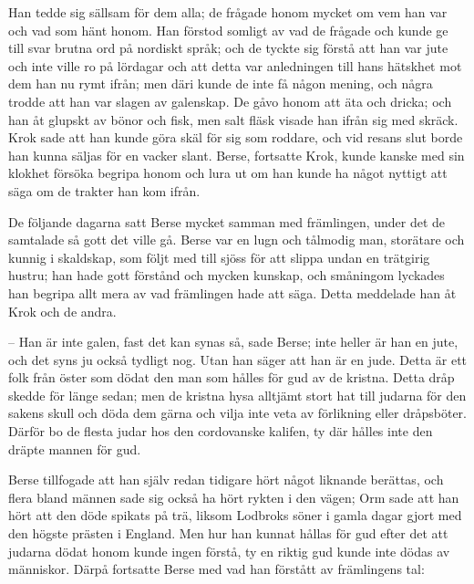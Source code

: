 \initial Han tedde sig sällsam för dem alla; de frågade honom mycket om vem han var och vad som hänt honom. Han förstod somligt av vad de frågade och kunde ge till svar brutna ord på nordiskt språk; och de tyckte sig förstå att han var jute och inte ville ro på lördagar och att detta var anledningen till hans hätskhet mot dem han nu rymt ifrån; men däri kunde de inte få någon mening, och några trodde att han var slagen av galenskap. De gåvo honom att äta och dricka; och han åt glupskt av bönor och fisk, men salt fläsk visade han ifrån sig med skräck. Krok sade att han kunde göra skäl för sig som roddare, och vid resans slut borde han kunna säljas för en vacker slant. Berse, fortsatte Krok, kunde kanske med sin klokhet försöka begripa honom och lura ut om han kunde ha något nyttigt att säga om de trakter han kom ifrån.

\initial De följande dagarna satt Berse mycket samman med främlingen, under det de samtalade så gott det ville gå. Berse var en lugn och tålmodig man, storätare och kunnig i skaldskap, som följt med till sjöss för att slippa undan en trätgirig hustru; han hade gott förstånd och mycken kunskap, och småningom lyckades han begripa allt mera av vad främlingen hade att säga. Detta meddelade han åt Krok och de andra.

– Han är inte galen, fast det kan synas så, sade Berse; inte heller är han en jute, och det syns ju också tydligt nog. Utan han säger att han är en jude. Detta är ett folk från öster som dödat den man som hålles för gud av de kristna. Detta dråp skedde för länge sedan; men de kristna hysa alltjämt stort hat till judarna för den sakens skull och döda dem gärna och vilja inte veta av förlikning eller dråpsböter. Därför bo de flesta judar hos den cordovanske kalifen, ty där hålles inte den dräpte mannen för gud.

\initial Berse tillfogade att han själv redan tidigare hört något liknande berättas, och flera bland männen sade sig också ha hört rykten i den vägen; Orm sade att han hört att den döde spikats på trä, liksom Lodbroks söner i gamla dagar gjort med den högste prästen i England. Men hur han kunnat hållas för gud efter det att judarna dödat honom kunde ingen förstå, ty en riktig gud kunde inte dödas av människor. Därpå fortsatte Berse med vad han förstått av främlingens tal:

